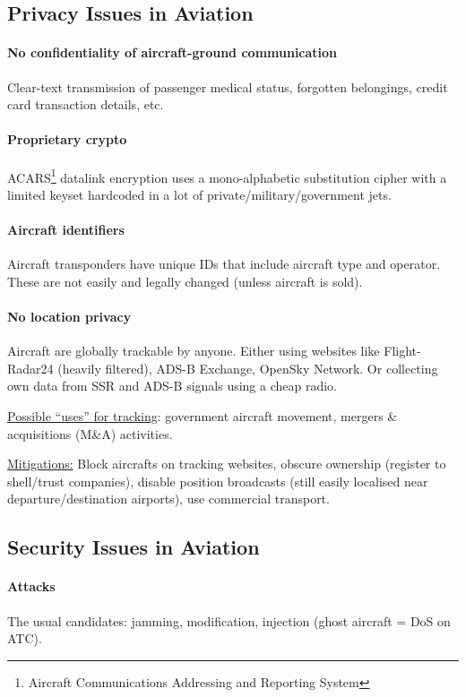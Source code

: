 \subsection{Privacy Issues in Aviation}

\paragraph{No confidentiality of aircraft-ground communication}
Clear-text transmission of passenger medical status, forgotten belongings, credit card transaction details, etc.

\paragraph{Proprietary crypto}
ACARS\footnote{Aircraft Communications Addressing and Reporting System}
datalink encryption uses a mono-alphabetic substitution cipher with a limited keyset hardcoded in a lot of private/military/government jets.

\paragraph{Aircraft identifiers}
Aircraft transponders have unique IDs that include aircraft type and operator.
These are not easily and legally changed (unless aircraft is sold).

\paragraph{No location privacy}
Aircraft are globally trackable by anyone.
Either using websites like Flight-Radar24 (heavily filtered), ADS-B Exchange, OpenSky Network.
Or collecting own data from SSR and ADS-B signals using a cheap radio.

\underline{Possible ``uses'' for tracking}:
government aircraft movement, mergers \& acquisitions (M\&A) activities.

\underline{Mitigations:}
Block aircrafts on tracking websites, obscure ownership (register to shell/trust companies), disable position broadcasts (still easily localised near departure/destination airports), use commercial transport.

\subsection{Security Issues in Aviation}

\paragraph{Attacks}
The usual candidates: jamming, modification, injection (ghost aircraft = DoS on ATC).

